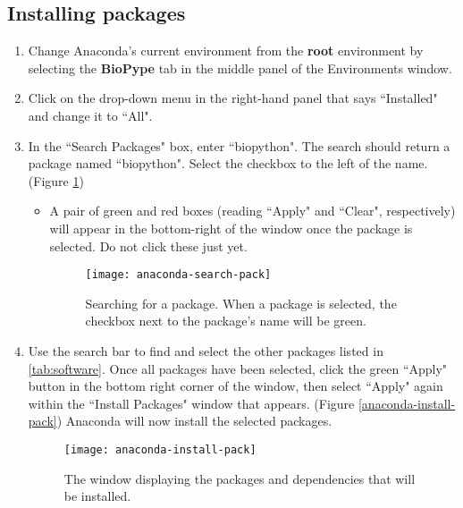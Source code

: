 \subsection{Installing packages}
    \begin{enumerate}
        \item Change Anaconda's current environment from the \textbf{root} environment by selecting the \textbf{BioPype} tab in the middle panel of the Environments window.
        \item Click on the drop-down menu in the right-hand panel that says ``Installed" and change it to ``All".
        \item In the ``Search Packages" box, enter ``biopython". The search should return a package named ``biopython". Select the checkbox to the left of the name. (Figure \ref{anaconda-search-pack})
        \begin{itemize}
            \item A pair of green and red boxes (reading ``Apply" and ``Clear", respectively) will appear in the bottom-right of the window once the package is selected. Do not click these just yet. 
    \begin{figure}[hbtp]
        \begin{center}
        \texttt{[image: anaconda-search-pack]}
        \caption{Searching for a package. When a package is selected, the checkbox next to the package's name will be green.}
        \label{anaconda-search-pack}
        \end{center}
    \end{figure}
        \end{itemize}
        \item Use the search bar to find and select the other packages listed in \autoref{tab:software}. Once all packages have been selected, click the green ``Apply" button in the bottom right corner of the window, then select ``Apply" again within the ``Install Packages" window that appears. (Figure \ref{anaconda-install-pack}) Anaconda will now install the selected packages.
    \begin{figure}[hbtp]
        \begin{center}
        \texttt{[image: anaconda-install-pack]}
        \caption{The window displaying the packages and dependencies that will be installed.}

\end{center}
\end{figure}
\end{enumerate}
